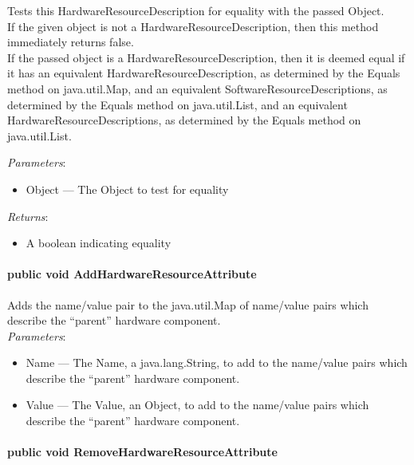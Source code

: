 \documentclass[$Date: 2003/06/26 19:29:31 $]{glabarticle}
\begin{document}
Tests this HardwareResourceDescription for equality with the passed
Object. \\

 If the given object is not a HardwareResourceDescription, then this
 method immediately returns false. \\
 
 If the passed object is a HardwareResourceDescription, then it is
 deemed equal if it has an equivalent HardwareResourceDescription, as
 determined by the Equals method on java.util.Map, and an equivalent
 SoftwareResourceDescriptions, as determined by the Equals method on
 java.util.List, and an equivalent HardwareResourceDescriptions, as determined
 by the Equals method on java.util.List.
 
 
\textit{Parameters}:
\begin{itemize}
\item[] Object --- The Object to test for equality 
\end{itemize}

\textit{Returns}:
\begin{itemize}
\item[] A boolean indicating equality
\end{itemize}
 
\paragraph{public void AddHardwareResourceAttribute}

Adds the name/value pair to the java.util.Map of name/value pairs which
describe the ``parent'' hardware component. \\

\textit{Parameters}:
\begin{itemize}
\item[] Name --- The Name, a java.lang.String, to add to the  name/value pairs which describe the ``parent'' 
hardware component.
\item[] Value --- The Value, an Object, to add to the  name/value pairs which describe the ``parent'' 
hardware component.
\end{itemize}

\paragraph{public void RemoveHardwareResourceAttribute}
\end{document}

